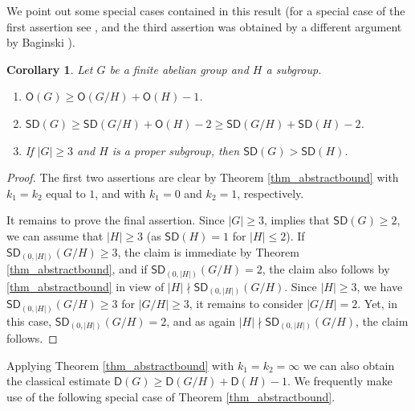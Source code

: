 \documentclass{amsart}
\newtheorem{co}[thm]{Corollary}
\theoremstyle{definition}
\numberwithin{equation}{section}
\begin{document}
We point out some special cases contained in this result (for a special case of the first assertion see \cite{baginski}, and the third assertion was obtained by a different argument by Baginski \cite{baliski}).
\begin{co}
Let $G$ be a finite abelian group and $H$ a subgroup.
\begin{enumerate}
\item ${\mathsf{O}}(G)\ge {\mathsf{O}}(G/H) + {\mathsf{O}}(H) - 1$.
\item ${\mathsf{SD}}(G)\ge {\mathsf{SD}}(G/H) + {\mathsf{O}}(H) - 2 \ge {\mathsf{SD}}(G/H) + {\mathsf{SD}}(H) - 2$.
\item If $|G|\ge 3$ and $H$ is a proper subgroup, then ${\mathsf{SD}}(G) > {\mathsf{SD}}(H)$.
\end{enumerate}
\end{co}
\begin{proof}
The first two assertions are clear by Theorem \ref{thm_abstractbound} with $k_1=k_2$ equal to $1$,
and with $k_1=0$ and $k_2=1$, respectively.

It remains to prove the final assertion.
Since $|G|\ge 3$, implies that ${\mathsf{SD}}(G)\ge 2$, we can assume that
$|H|\ge 3$ (as ${\mathsf{SD}}(H)=1$ for $|H|\le 2$).
If ${\mathsf{SD}}_{(0,|H|)}(G/H)\ge 3$, the claim is immediate by Theorem \ref{thm_abstractbound},
and if ${\mathsf{SD}}_{(0,|H|)}(G/H)=2$, the claim also follows by \ref{thm_abstractbound} in view of
$|H|\nmid {\mathsf{SD}}_{(0,|H|)}(G/H)$. Since $|H|\ge 3$, we have
${\mathsf{SD}}_{(0,|H|)}(G/H)\ge 3$ for $|G/H|\ge 3$, it remains
to consider $|G/H|=2$. Yet, in this case, ${\mathsf{SD}}_{(0,|H|)}(G/H)=2$, and
as again $|H|\nmid {\mathsf{SD}}_{(0,|H|)}(G/H)$, the claim follows.
\end{proof}
Applying Theorem \ref{thm_abstractbound} with $k_1= k_2 = \infty$
we can also obtain the classical estimate ${\mathsf{D}}(G)\ge {\mathsf{D}}(G/H)+ {\mathsf{D}}(H)-1$.
We frequently make use of the following special case of Theorem \ref{thm_abstractbound}.
\end{document}

